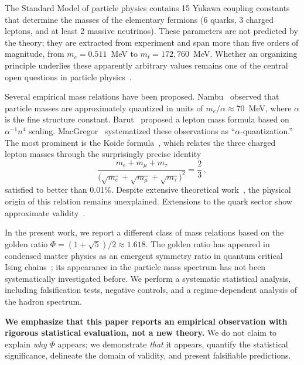 \documentclass[11pt,a4paper]{article}
\begin{document}
The Standard Model of particle physics contains 15 Yukawa coupling
constants that determine the masses of the elementary fermions
(6 quarks, 3 charged leptons, and at least 2 massive neutrinos).
These parameters are not predicted by the theory; they are extracted
from experiment and span more than five orders of magnitude, from
$m_e = 0.511$~MeV to $m_t = 172{,}760$~MeV. Whether an organizing
principle underlies these apparently arbitrary values remains one of
the central open questions in particle physics~\cite{Xing2020,Fritzsch1999}.

Several empirical mass relations have been proposed. Nambu~\cite{Nambu1952}
observed that particle masses are approximately quantized in units of
$m_e / \alpha \approx 70$~MeV, where $\alpha$ is the fine structure
constant. Barut~\cite{Barut1979} proposed a lepton mass formula
based on $\alpha^{-1} n^4$ scaling. MacGregor~\cite{MacGregor2007}
systematized these observations as ``$\alpha$-quantization.'' The most
prominent is the Koide formula~\cite{Koide1981}, which relates the
three charged lepton masses through the surprisingly precise identity
\begin{equation}
  \frac{m_e + m_\mu + m_\tau}
       {\bigl(\sqrt{m_e} + \sqrt{m_\mu} + \sqrt{m_\tau}\bigr)^2}
  = \frac{2}{3}\,,
  \label{eq:koide}
\end{equation}
satisfied to better than 0.01\%. Despite extensive theoretical
work~\cite{Sumino2009,GaoLi2016,Sun2021,RiveroGsponer2005,Foot1994},
the physical
origin of this relation remains unexplained. Extensions to the quark
sector show approximate validity~\cite{GaoLi2016}.

In the present work, we report a different class of mass relations
based on the golden ratio $\Phi = (1{+}\sqrt{5})/2 \approx 1.618$.
The golden ratio has appeared in condensed matter physics as an
emergent symmetry ratio in quantum critical Ising
chains~\cite{Coldea2010}; its appearance in the particle mass
spectrum has not been systematically investigated before.
We perform a systematic statistical analysis, including falsification
tests, negative controls, and a regime-dependent analysis of the
hadron spectrum.

\textbf{We emphasize that this paper reports an empirical observation
with rigorous statistical evaluation, not a new theory.} We do not
claim to explain \emph{why} $\Phi$ appears; we demonstrate
\emph{that} it appears, quantify the statistical significance,
delineate the domain of validity, and present falsifiable predictions.
\end{document}
